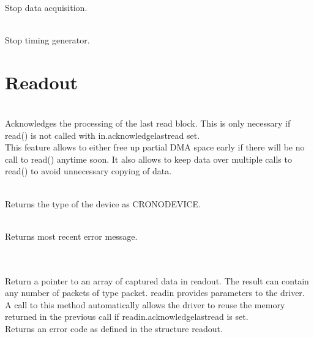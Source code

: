 			\\
			Stop data acquisition.\par

			\\
			Stop timing generator.\par

	\section{Readout\label{cp:readout}}

		 \\
		Acknowledges the processing of the last read block. This is only necessary if \textsf{\prefix read()} is not called with 
		\textsf{in.acknowledge\tu last\tu read} set.\\
		This feature allows to either free up partial DMA space early if there will be no call to \textsf{\prefix read()} anytime soon. 
		It also allows to keep data over multiple calls to \textsf{\prefix read()} to avoid unnecessary copying of data. \par

		\\
		Returns the type of the device as \textsf{CRONO\tu DEVICE\tu {}}.\par

		\\
		Returns most recent error message.\par

		  \\ \\
		Return a pointer to an array of captured data in \textsf{read\tu out}. 
		The result can contain any number of packets of type \textsf{\prefix packet}.
		\textsf{read\tu in} provides parameters to the driver. 
		A call to this method automatically allows the driver to reuse the memory returned in the previous call if \textsf{read\tu in.acknowledge\tu last\tu read} is set.\\
		Returns an error code as defined in the structure \textsf{\prefix read\tu out}.

